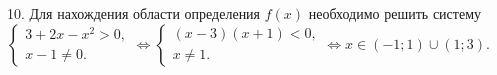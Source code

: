10. Для нахождения области определения $f(x)$ необходимо решить систему $\begin{cases} 3+2x-x^2>0,\\ x-1\neq0.\end{cases}\Leftrightarrow
\begin{cases} (x-3)(x+1)<0,\\ x\neq1.\end{cases}\Leftrightarrow x\in(-1;1)\cup(1;3).$\\
